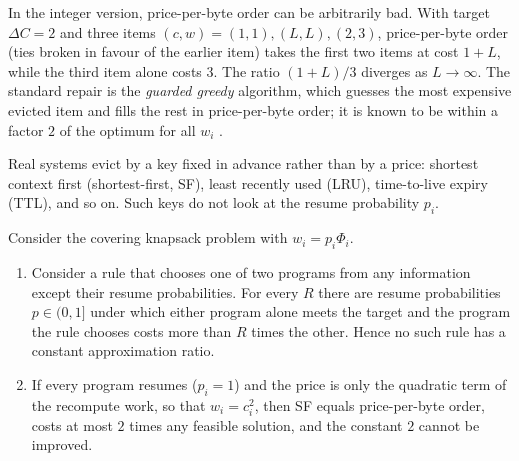 In the integer version, price-per-byte order can be arbitrarily bad. With target
$\Delta C=2$ and three items $(c,w)=(1,1),(L,L),(2,3)$, price-per-byte order (ties
broken in favour of the earlier item) takes the first two items at cost $1+L$,
while the third item alone costs $3$. The ratio $(1+L)/3$ diverges as
$L\to\infty$. The standard repair is the \emph{guarded greedy} algorithm, which
guesses the most expensive evicted item and fills the rest in price-per-byte
order; it is known to be within a factor $2$ of the optimum for all $w_i$
\cite{csirik1991}.

Real systems evict by a key fixed in advance rather than by a price: shortest
context first (shortest-first, SF), least recently used (LRU), time-to-live
expiry (TTL), and so on. Such keys do not look at the resume probability $p_i$.

\begin{proposition}\label{prop:blind}
Consider the covering knapsack problem with $w_i=p_i\Phi_i$.
\begin{enumerate}[label=(\roman*)]
\item Consider a rule that chooses one of two programs from any information except
  their resume probabilities. For every $R$ there are resume probabilities
  $p\in(0,1]$ under which either program alone meets the target and the program
  the rule chooses costs more than $R$ times the other. Hence no such rule has a
  constant approximation ratio.
\item If every program resumes ($p_i=1$) and the price is only the quadratic term
  of the recompute work, so that $w_i=c_i^2$, then SF equals price-per-byte order,
  costs at most $2$ times any feasible solution, and the constant $2$ cannot be
  improved.
\end{enumerate}
\end{proposition}

